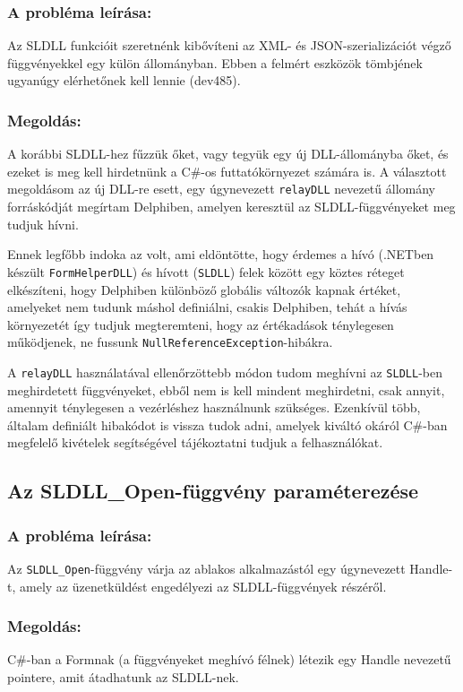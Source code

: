 \documentclass[tocnopagenum]{thesis-ekf}
\theoremstyle{definition}
\theoremstyle{remark}
\begin{document}
	\subsubsection{A probléma leírása:} Az SLDLL funkcióit szeretnénk kibővíteni az XML- és JSON-szerializációt végző függvényekkel egy külön állományban. Ebben a felmért eszközök tömbjének ugyanúgy elérhetőnek kell lennie (dev485).
	\subsubsection{Megoldás:} A korábbi SLDLL-hez fűzzük őket, vagy tegyük egy új DLL-állományba őket, és ezeket is meg kell hirdetnünk a C\#-os futtatókörnyezet számára is. A választott megoldásom az új DLL-re esett, egy úgynevezett \verb*|relayDLL| nevezetű állomány forráskódját megírtam Delphiben, amelyen keresztül az SLDLL-függvényeket meg tudjuk hívni.
	
	Ennek legfőbb indoka az volt, ami eldöntötte, hogy érdemes a hívó (.NETben készült \verb*|FormHelperDLL|) és hívott (\verb*|SLDLL|) felek között egy köztes réteget elkészíteni, hogy Delphiben különböző globális változók kapnak értéket, amelyeket nem tudunk máshol definiálni, csakis Delphiben, tehát a hívás környezetét így tudjuk megteremteni, hogy az értékadások ténylegesen működjenek, ne fussunk \verb*|NullReferenceException|-hibákra.
	
	A \verb*|relayDLL| használatával ellenőrzöttebb módon tudom meghívni az \verb*|SLDLL|-ben meghirdetett függvényeket, ebből nem is kell mindent meghirdetni, csak annyit, amennyit ténylegesen a vezérléshez használnunk szükséges. Ezenkívül több, általam definiált hibakódot is vissza tudok adni, amelyek kiváltó okáról C\#-ban megfelelő kivételek segítségével tájékoztatni tudjuk a felhasználókat.
	\subsection{Az SLDLL\_Open-függvény paraméterezése}
	\subsubsection{A probléma leírása:} Az \verb*|SLDLL_Open|-függvény várja az ablakos alkalmazástól egy úgynevezett Handle-t, amely az üzenetküldést engedélyezi az SLDLL-függvények részéről.
	\subsubsection{Megoldás: } C\#-ban a Formnak (a függvényeket meghívó félnek) létezik egy Handle nevezetű pointere, amit átadhatunk az SLDLL-nek.
\end{document}

